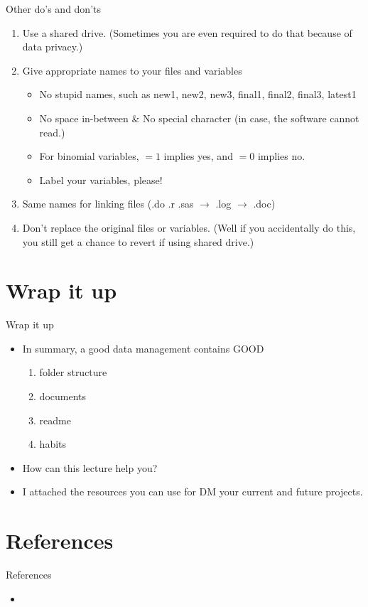 \documentclass{beamer}
\begin{document}
\begin{frame}{Other do's and don'ts}
	\begin{enumerate}
	\item Use a shared drive. (Sometimes you are even required to do that because of data privacy.)
	\item Give appropriate names to your files and variables	
	\begin{itemize}
		\item No stupid names, such as new1, new2, new3, final1, final2, final3, latest1
		\item No space in-between & No special character (in case, the software cannot read.)
		\item For binomial variables, $=1$ implies yes, and $=0$ implies no.
		\item Label your variables, please!
	\end{itemize}
	\item Same names for linking files (.do .r .sas $\rightarrow$ .log $\rightarrow$ .doc)
	\item Don't replace the original files or variables. (Well if you accidentally do this, you still get a chance to revert if using shared drive.)
	\end{enumerate}

\end{frame}

\section{Wrap it up}
\begin{frame}{Wrap it up}
\begin{itemize}
\item In summary, a good data management contains GOOD
\begin{enumerate}
	\item folder structure
	\item documents
	\item readme
	\item habits
\end{enumerate}

\item How can this lecture help you? \\
\item I attached the resources you can use for DM your current and future projects.
\end{itemize}
\end{frame}

\section{References}
\begin{frame}{References}
\begin{itemize}
	\item	
\end{itemize}
\end{frame}
\end{document}
